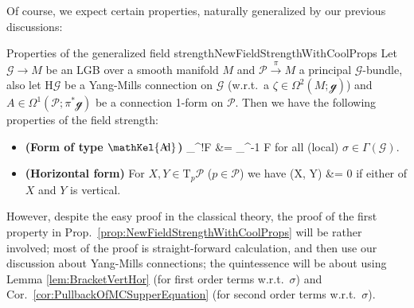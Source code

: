 \documentclass[a4paper,oneside,11pt,bibliography=totoc]{scrartcl}
\DeclareMathOperator{\sAd}{\mathKel{A\mkern-5.5mu d}}
\def\bas#1\eas{\begin{align*}#1\end{align*}}
\theoremstyle{plain}
\theoremstyle{remark}
\theoremstyle{definition}
\begin{document}
Of course, we expect certain properties, naturally generalized by our previous discussions:

\begin{propositions}{Properties of the generalized field strength}{NewFieldStrengthWithCoolProps}
Let $\mathcal{G} \to M$ be an LGB over a smooth manifold $M$ and $\mathcal{P} \stackrel{\pi}{\to} M$ a principal $\mathcal{G}$-bundle, also let $\mathrm{H}\mathcal{G}$ be a Yang-Mills connection on $\mathcal{G}$ (w.r.t.\ a $\zeta \in \Omega^2(M; \mathcal{g})$) and $A \in \Omega^1(\mathcal{P}; \pi^*\mathcal{g})$ be a connection 1-form on $\mathcal{P}$. Then we have the following properties of the field strength:
\begin{itemize}
	\item \textbf{(Form of type $\sAd$)}
	\bas
	\mathcal{r}_{\sigma}^!F
	&=
	\sAd_{\sigma^{-1}} \circ F
	\eas
	for all (local) $\sigma \in \Gamma(\mathcal{G})$.
	\item \textbf{(Horizontal form)}
	\newline
	For $X, Y \in \mathrm{T}_p\mathcal{P}$ ($p \in \mathcal{P}$) we have
	\bas
	F(X, Y)
	&=
	0
	\eas
	if either of $X$ and $Y$ is vertical.
\end{itemize}
\end{propositions}

However, despite the easy proof in the classical theory, the proof of the first property in Prop.\ \ref{prop:NewFieldStrengthWithCoolProps} will be rather involved; most of the proof is straight-forward calculation, and then use our discussion about Yang-Mills connections; the quintessence will be about using Lemma \ref{lem:BracketVertHor} (for first order terms w.r.t.\ $\sigma$) and Cor.\ \ref{cor:PullbackOfMCSupperEquation} (for second order terms w.r.t.\ $\sigma$).
\end{document}
